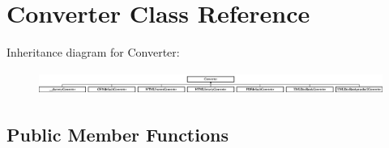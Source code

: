 \hypertarget{class_converter}{\section{\-Converter \-Class \-Reference}
\label{class_converter}
}
\-Inheritance diagram for \-Converter\-:\begin{figure}[H]
\begin{center}
\leavevmode
\includegraphics[height=0.765550cm]{class_converter}
\end{center}
\end{figure}
\subsection*{\-Public \-Member \-Functions}
